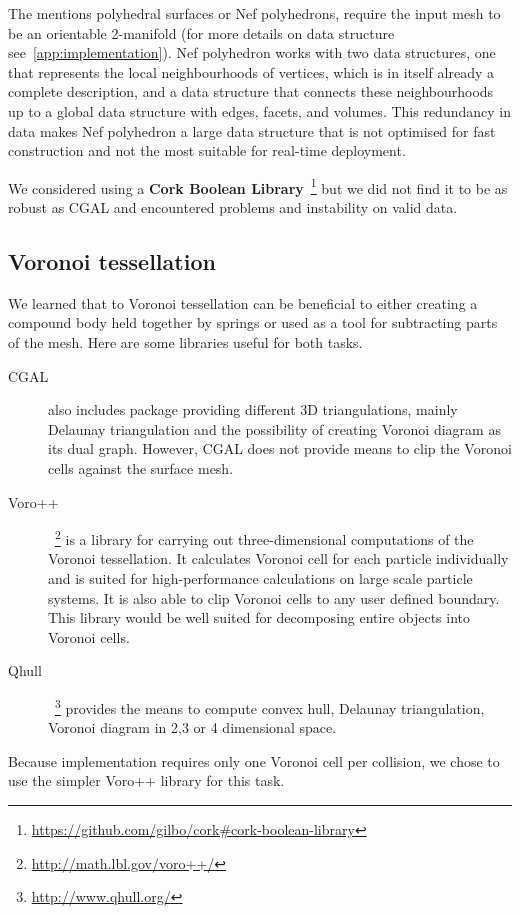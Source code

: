 The mentions polyhedral surfaces or Nef polyhedrons, require the input mesh to be an orientable 2-manifold (for more details on data structure see~\cref{app:implementation}). Nef polyhedron works with two data structures, one that represents the local neighbourhoods of vertices, which is in itself already a complete description, and a data structure that connects these neighbourhoods up to a global data structure with edges, facets, and volumes. This redundancy in data makes Nef polyhedron a large data structure that is not optimised for fast construction and not the most suitable for real-time deployment.

We considered using a \textbf{Cork Boolean Library}~\footnote{\url{https://github.com/gilbo/cork\#cork-boolean-library}} but we did not find it to be as robust as CGAL and encountered problems and instability on valid data.

\subsection{Voronoi tessellation}
We learned that to Voronoi tessellation can be beneficial to either creating a compound body held together by springs or used as a tool for subtracting parts of the mesh. Here are some libraries useful for both tasks.

\begin{description}
\item[CGAL] also includes package providing different 3D triangulations, mainly Delaunay triangulation and the possibility of creating Voronoi diagram as its dual graph. However, CGAL does not provide means to clip the Voronoi cells against the surface mesh.

\item[Voro++]~\footnote{\url{http://math.lbl.gov/voro++/}} is a library for carrying out three-dimensional computations of the Voronoi tessellation. It calculates Voronoi cell for each particle individually and is suited for high-performance calculations on large scale particle systems. It is also able to clip Voronoi cells to any user defined boundary. This library would be well suited for decomposing entire objects into Voronoi cells. 

\item[Qhull]~\footnote{\url{http://www.qhull.org/}} provides the means to compute convex hull, Delaunay triangulation, Voronoi diagram in 2,3 or 4 dimensional space.

\end{description}
Because implementation requires only one Voronoi cell per collision, we chose to use the simpler Voro++ library for this task. 



